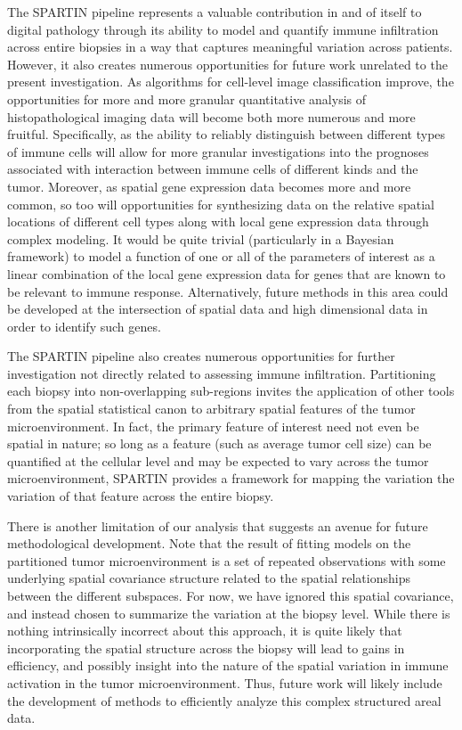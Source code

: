 \documentclass[
]{book}
\begin{document}
The SPARTIN pipeline represents a valuable contribution in and of
itself to digital pathology
through its ability to model and quantify immune infiltration
across entire biopsies in a way that captures meaningful variation
across patients. However, it also creates numerous opportunities
for future work unrelated to the present investigation. As algorithms for cell-level image classification improve, the
opportunities for more and more granular quantitative analysis of
histopathological imaging data will become both more numerous and
more fruitful. Specifically, as the ability to reliably distinguish between different types of immune cells will allow for more granular investigations into the prognoses associated with interaction between immune cells of different kinds and the tumor. Moreover, as spatial gene expression data becomes
more and more common, so too will opportunities for synthesizing
data on the relative spatial locations of different cell types
along with local gene expression data through complex modeling. It would be quite
trivial (particularly in a Bayesian framework) to model a function
of one or all of the parameters of interest as a linear combination
of the local gene expression data for genes that are known to be
relevant to immune response. Alternatively, future methods in this
area could be developed at the intersection of spatial data and
high dimensional data in order to identify such genes.

The SPARTIN pipeline also creates numerous opportunities for further investigation not directly related to assessing immune infiltration. Partitioning each biopsy into non-overlapping
sub-regions invites the application
of other tools from the spatial statistical canon to arbitrary spatial features of the tumor microenvironment. In fact, the primary feature of interest need not even be spatial in nature; so long as a feature (such as average tumor cell size) can be quantified at the cellular level and may be expected to vary across the tumor microenvironment, SPARTIN provides a framework for mapping the variation the variation of that feature across the entire biopsy.

There is another limitation of our analysis that suggests an avenue for future methodological development. Note that the result of fitting models on the partitioned tumor microenvironment is a set of repeated observations with some underlying spatial covariance structure related to the spatial relationships between the different subspaces. For now, we have ignored this spatial covariance, and instead chosen to summarize the variation at the biopsy level. While there is nothing intrinsically incorrect about this approach, it is quite likely that incorporating the spatial structure across the biopsy will lead to gains in efficiency, and possibly insight into the nature of the spatial variation in immune activation in the tumor microenvironment. Thus, future work will likely include the development of methods to efficiently analyze this complex structured areal data.

  
\end{document}
